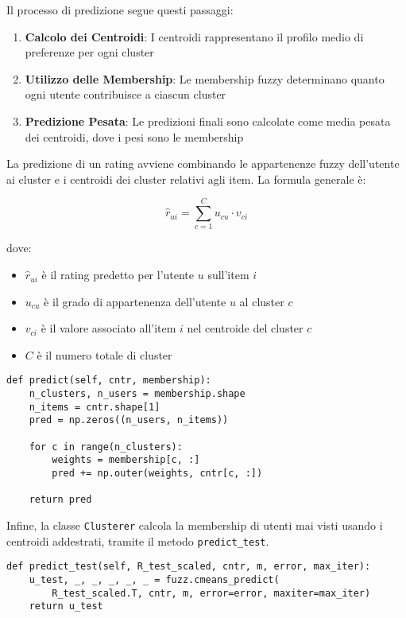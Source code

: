 Il processo di predizione segue questi passaggi:

\begin{enumerate}
    \item \textbf{Calcolo dei Centroidi}: I centroidi rappresentano il profilo medio di preferenze per ogni cluster
    \item \textbf{Utilizzo delle Membership}: Le membership fuzzy determinano quanto ogni utente contribuisce a ciascun cluster
    \item \textbf{Predizione Pesata}: Le predizioni finali sono calcolate come media pesata dei centroidi, dove i pesi sono le membership
\end{enumerate}

La predizione di un rating avviene combinando le appartenenze fuzzy dell’utente ai cluster e i centroidi dei cluster relativi agli item. La formula generale è:

\[
\hat{r}_{ui} = \sum_{c=1}^{C} u_{cu} \cdot v_{ci}
\]

dove:
\begin{itemize}
    \item $\hat{r}_{ui}$ è il rating predetto per l’utente $u$ sull’item $i$
    \item $u_{cu}$ è il grado di appartenenza dell’utente $u$ al cluster $c$
    \item $v_{ci}$ è il valore associato all’item $i$ nel centroide del cluster $c$
    \item $C$ è il numero totale di cluster
\end{itemize}


\begin{lstlisting}[style=PythonStyle, caption=Algoritmo di predizione della classe Clusterer]
def predict(self, cntr, membership):
    n_clusters, n_users = membership.shape
    n_items = cntr.shape[1]
    pred = np.zeros((n_users, n_items))
    
    for c in range(n_clusters):
        weights = membership[c, :] 
        pred += np.outer(weights, cntr[c, :])

    return pred
\end{lstlisting}

Infine, la classe \texttt{Clusterer} calcola la membership di utenti mai visti usando i centroidi addestrati, tramite il metodo \texttt{predict\_test}.
\begin{lstlisting}[style=PythonStyle, caption=Calcolo della Membership in fase di test]
def predict_test(self, R_test_scaled, cntr, m, error, max_iter):
    u_test, _, _, _, _, _ = fuzz.cmeans_predict(
        R_test_scaled.T, cntr, m, error=error, maxiter=max_iter)
    return u_test
\end{lstlisting}

